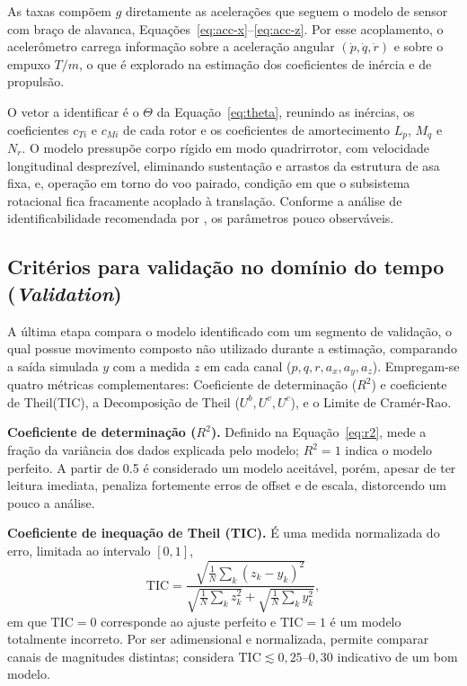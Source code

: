 As taxas compõem $g$ diretamente as acelerações que seguem o modelo de sensor com braço de alavanca, Equações~\eqref{eq:acc-x}--\eqref{eq:acc-z}. Por esse acoplamento, o acelerômetro carrega informação sobre a aceleração angular $(\dot p,\dot q,\dot r)$ e sobre o empuxo $T/m$, o que é explorado na estimação dos coeficientes de inércia e de propulsão.

O vetor a identificar é o $\Theta$ da Equação~\eqref{eq:theta}, reunindo as inércias, os coeficientes $c_{Ti}$ e $c_{Mi}$ de cada rotor e os coeficientes de amortecimento $L_p$, $M_q$ e $N_r$. O modelo pressupõe corpo rígido em modo quadrirrotor, com velocidade longitudinal desprezível, eliminando sustentação e arrastos da estrutura de asa fixa, e, operação em torno do voo pairado, condição em que o subsistema rotacional fica fracamente acoplado à translação. Conforme a análise de identificabilidade recomendada por \textcite{Jategaonkar2015}, os parâmetros pouco observáveis.

\subsection{Critérios para validação no domínio do tempo (\textit{Validation})}
\label{sec:validacao-criterios}

A última etapa compara o modelo identificado com um segmento de validação, o qual possue movimento composto não utilizado durante a estimação, comparando a saída simulada $y$ com a medida $z$ em cada canal ($p,q,r,a_x,a_y,a_z$). Empregam-se quatro métricas complementares: Coeficiente de determinação ($R^2$) e coeficiente de Theil(TIC), a Decomposição de Theil ($U^b, U^v, U^c$), e o Limite de Cramér-Rao.

\textbf{Coeficiente de determinação ($R^2$).} Definido na Equação~\eqref{eq:r2}, mede a fração da variância dos dados explicada pelo modelo; $R^2=1$ indica o modelo perfeito. A partir de 0.5 é considerado um modelo aceitável, porém, apesar de ter leitura imediata, penaliza fortemente erros de offset e de escala, distorcendo um pouco a análise.

\textbf{Coeficiente de inequação de Theil (TIC).} É uma medida normalizada do erro, limitada ao intervalo $[0,1]$,
\begin{equation}
\mathrm{TIC} = \frac{\sqrt{\tfrac{1}{N}\sum_k (z_k - y_k)^2}}{\sqrt{\tfrac{1}{N}\sum_k z_k^2} + \sqrt{\tfrac{1}{N}\sum_k y_k^2}},
\label{eq:tic}
\end{equation}
em que $\mathrm{TIC}=0$ corresponde ao ajuste perfeito e $\mathrm{TIC}=1$ é um modelo totalmente incorreto. Por ser adimensional e normalizada, permite comparar canais de magnitudes distintas; \textcite{Jategaonkar2015} considera $\mathrm{TIC} \lesssim 0{,}25$--$0{,}30$ indicativo de um bom modelo.

